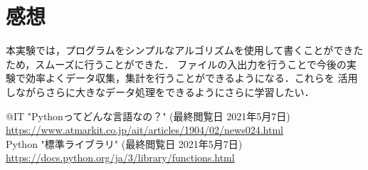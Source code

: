 \documentclass[a4paper,11pt]{jsarticle}
\begin{document}
  \section{感想}
  本実験では，プログラムをシンプルなアルゴリズムを使用して書くことができたため，スムーズに行うことができた．
  ファイルの入出力を行うことで今後の実験で効率よくデータ収集，集計を行うことができるようになる．これらを
  活用しながらさらに大きなデータ処理をできるようにさらに学習したい．
  
  \begin{thebibliography}{1}
     @IT "Pythonってどんな言語なの？" (最終閲覧日 2021年5月7日)\\ \url{https://www.atmarkit.co.jp/ait/articles/1904/02/news024.html}\\
     Python "標準ライブラリ" (最終閲覧日 2021年5月7日)\\ \url{https://docs.python.org/ja/3/library/functions.html}\\
  \end{thebibliography}
\end{document}
